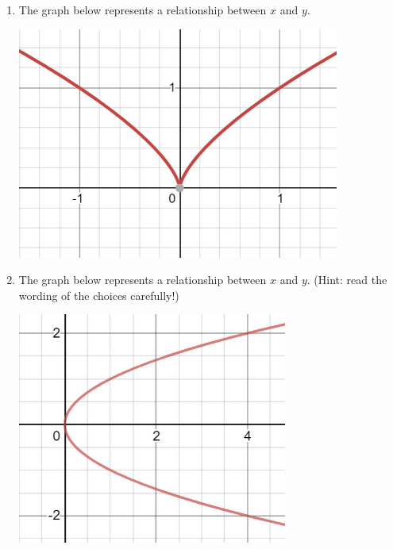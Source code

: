 \documentclass{ximera}
\begin{document}
\begin{problem}
\begin{enumerate}
\begin{image}
 \end{image}
 \item The graph below represents a relationship between $x$ and $y$. 
    \begin{image}
   \includegraphics[height=3in]{160H1pic4.jpg}
 \end{image}
  \item The graph below represents a relationship between $x$ and $y$. 
  (Hint: read the wording of the choices carefully!)
    \begin{image}
   \includegraphics[height=3in]{160H1pic5.jpg}
 \end{image}
\end{enumerate}
\end{problem}
\end{document}
